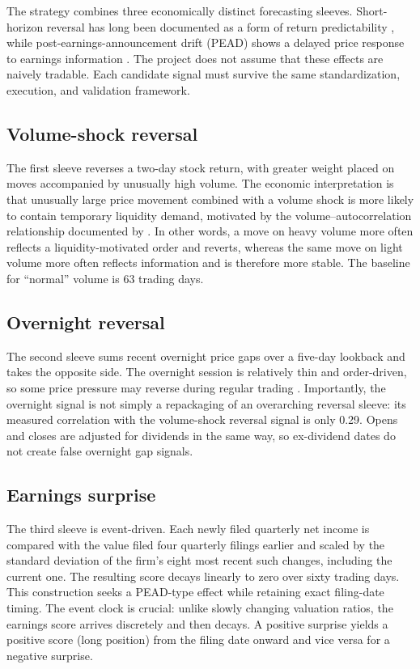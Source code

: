 \documentclass[11pt]{article}
\begin{document}
The strategy combines three economically distinct forecasting sleeves. Short-horizon reversal has long been documented as a form of return predictability \citep{lehmann1990,jegadeesh1990}, while post-earnings-announcement drift (PEAD) shows a delayed price response to earnings information \citep{bernard1989}. The project does not assume that these effects are naively tradable. Each candidate signal must survive the same standardization, execution, and validation framework.

\subsection{Volume-shock reversal}

The first sleeve reverses a two-day stock return, with greater weight placed on moves accompanied by unusually high volume. The economic interpretation is that unusually large price movement combined with a volume shock is more likely to contain temporary liquidity demand, motivated by the volume--autocorrelation relationship documented by \citet{cgw1993}.  In other words, a move on heavy volume more often reflects a liquidity-motivated order and reverts, whereas the same move on light volume more often reflects information and is therefore more stable. The baseline for ``normal'' volume is 63 trading days.
\subsection{Overnight reversal}

The second sleeve sums recent overnight price gaps over a five-day lookback and takes the opposite side. The overnight session is relatively thin and order-driven, so some price pressure may reverse during regular trading \citep{lps2019}. Importantly, the overnight signal is not simply a repackaging of an overarching reversal sleeve: its measured correlation with the volume-shock reversal signal is only 0.29. Opens and closes are adjusted for dividends in the same way, so ex-dividend dates do not create false overnight gap signals.

\subsection{Earnings surprise}

The third sleeve is event-driven. Each newly filed quarterly net income is compared with the value filed four quarterly
filings earlier and scaled by the standard deviation of the firm's eight most recent such changes, including the current
one. The resulting score decays linearly to zero over sixty trading days. This construction seeks a PEAD-type effect
while retaining exact filing-date timing. The event clock is crucial: unlike slowly changing valuation ratios, the
earnings score arrives discretely and then decays. A positive surprise yields a positive
score (long position) from the filing date onward and vice versa for a negative surprise.
\end{document}
